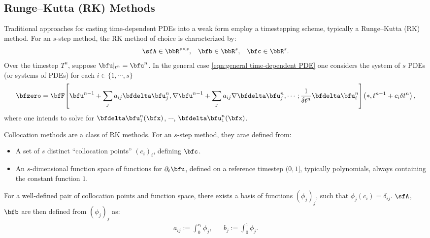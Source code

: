 \subsection{Runge--Kutta (RK) Methods}\label{cha:RK methods}
    Traditional approaches for casting time-dependent PDEs into a weak form employ a timestepping scheme, typically a Runge--Kutta (RK) method. For an $s$-step method, the RK method of choice is characterized by:
    \begin{align}
        \sfA  \in  \bbR^{s \times s},  &&
        \bfb  \in  \bbR^{s},  &&
        \bfc  \in  \bbR^{s}.
    \end{align}
    Over the timestep $T^{n}$, suppose $\bfu|_{t^{n}} = \bfu^{n}$. In the general case \ref{eqn:general time-dependent PDE} one considers the system of $s$ PDEs (or systems of PDEs) for each $i  \in  \{1, \cdots, s\}$ 
    \begin{equation}
        \bfzero  =  \bfF\!\left[\bfu^{n - 1} + \sum_{j}a_{ij}\bfdelta\bfu^{n}_{j}, \nabla\bfu^{n - 1} + \sum_{j}a_{ij}\nabla\bfdelta\bfu^{n}_{j}, \cdots; \frac{1}{\delta t^{n}}\bfdelta\bfu^{n}_{i}\right]\!\left(*, t^{n - 1} + c_{i}\delta t^{n}\right),
    \end{equation}
    where one intends to solve for $\bfdelta\bfu^{n}_{1}(\bfx)$, $\cdots$, $\bfdelta\bfu^{n}_{1}(\bfx)$.

    \line
    
    \begin{definition}
        Collocation methods are a class of RK methods. For an $s$-step method, they arae defined from:
        \begin{itemize}
            \item  A set of $s$ distinct ``collocation points'' $(c_{i})_{i}$, defining $\bfc$.
            \item  An $s$-dimensional function space of functions for $\partial_{t}\bfu$, defined on a reference timestep $(0, 1]$, typically polynomials, always containing the constant function $1$.
        \end{itemize}
        For a well-defined pair of collocation points and function space, there exists a basis of functions $(\phi_{j})_{j}$, such that $\phi_{j}(c_{i})  =  \delta_{ij}$. $\sfA$, $\bfb$ are then defined from $(\phi_{j})_{j}$ as:
        \begin{align}
            a_{ij}  :=  \int_{0}^{c_{i}}\phi_{j},  &&
            b_{j}   :=  \int_{0}^{1}\phi_{j}.
        \end{align}
    \end{definition}
    
